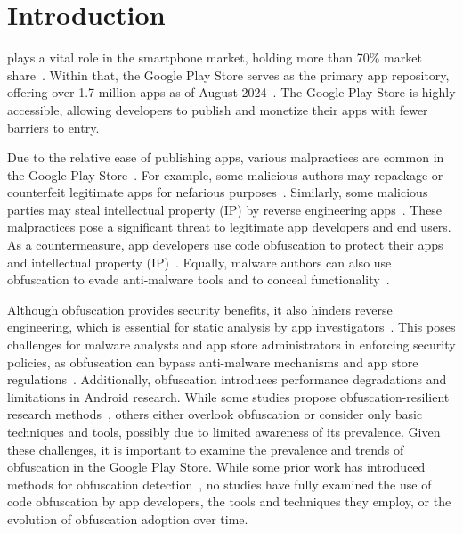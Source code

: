 \section{Introduction}
\label{Sec:Introduction}

 plays a vital role in the smartphone market, holding more than 70\% market share~\cite{StatCounter_Global_Stats}. Within that, the Google Play Store serves as the primary app repository, offering over 1.7 million apps as of August 2024~\cite{a2024_google_number}. The Google Play Store is highly accessible, allowing developers to publish and monetize their apps with fewer barriers to entry.

Due to the relative ease of publishing apps, various malpractices are common in the Google Play Store~\cite{GARG2021102087}. For example, some malicious authors may repackage or counterfeit legitimate apps for nefarious purposes~\cite{zhou2012detecting, bhat2019survey}. Similarly, some malicious parties may steal intellectual property (IP) by reverse engineering apps~\cite{albakri2022survey}. These malpractices pose a significant threat to legitimate app developers and end users. As a countermeasure, app developers use code obfuscation to protect their apps and intellectual property (IP)~\cite{faruki2016android}. Equally, malware authors can also use obfuscation to evade anti-malware tools and to conceal functionality~\cite{elsersy2022rise, SIHAG2021100365}.

Although obfuscation provides security benefits, it also hinders reverse engineering, which is essential for static analysis by app investigators~\cite{molina2025light, beer2024tabbed, tan2023ptpdroid}. This poses challenges for malware analysts and app store administrators in enforcing security policies, as obfuscation can bypass anti-malware mechanisms and app store regulations~\cite{elsersy2022rise, SIHAG2021100365}. Additionally, obfuscation introduces performance degradations and limitations in Android research\cite{tan2023ptpdroid, gao2024comprehensive, pradeep2022not}. While some studies propose obfuscation-resilient research methods~\cite{liu2023enhancing, wang2022malwhiteout, wang2023uncovering}, others either overlook obfuscation or consider only basic techniques and tools\cite{li2024malcertain, liu2023no, chen2024attention}, possibly due to limited awareness of its prevalence. Given these challenges, it is important to examine the prevalence and trends of obfuscation in the Google Play Store. While some prior work has introduced methods for obfuscation detection~\cite{dong2018understanding, kuhnel2015fast, park2019framework, wang2017changed, wermke2018large}, no studies have fully examined the use of code obfuscation by app developers, the tools and techniques they employ, or the evolution of obfuscation adoption over time. 


